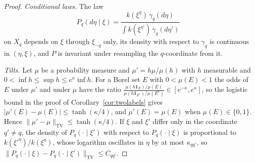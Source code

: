 \documentclass[11pt]{amsart}
\theoremstyle{definition}
\theoremstyle{remark}
\numberwithin{equation}{section}
\begin{document}
\begin{proof}
\emph{Conditional laws.} The law
\[
P_q(d\eta\mid\xi)=\frac{k(\xi^\eta)\,\gamma_q(d\eta)}{\int k(\xi^{\eta'})
\,\gamma_q(d\eta')}
\]
on $X_q$ depends on $\xi$ through $\xi_{-q}$ only, its density with respect
to $\gamma_q$ is continuous in $(\eta,\xi)$, and $P$ is invariant under
resampling the $q$-coordinate from it.

\emph{Tilts.} Let $\mu$ be a probability measure and $\mu'=h\mu/\mu(h)$
with $h$ measurable and $0<\inf h\le\sup h\le e^\kappa\inf h$. For a Borel
set $E$ with $0<\mu(E)<1$ the odds of $E$ under $\mu'$ and under $\mu$ have
the ratio $\frac{\mu(h\mathbf 1_E)/\mu(E)}{\mu(h\mathbf 1_{E^c})/\mu(E^c)}
\in[e^{-\kappa},e^\kappa]$, so the logistic bound in the proof of
Corollary~\ref{cor:twolabels} gives $\lvert\mu'(E)-\mu(E)\rvert\le\tanh
(\kappa/4)$, and $\mu'(E)=\mu(E)$ when $\mu(E)\in\{0,1\}$. Hence
$\lVert\mu'-\mu\rVert_{\mathrm{TV}}\le\tanh(\kappa/4)$. If $\xi$ and $\xi'$
differ only in the coordinate $q'\ne q$, the density of $P_q(\cdot\mid\xi')$
with respect to $P_q(\cdot\mid\xi)$ is proportional to
$k(\xi'^{\eta})/k(\xi^\eta)$, whose logarithm oscillates in $\eta$ by at
most $\kappa_{qq'}$, so $\lVert P_q(\cdot\mid\xi)-P_q(\cdot\mid\xi')\rVert_
{\mathrm{TV}}\le C_{qq'}$.


\end{proof}
\end{document}
